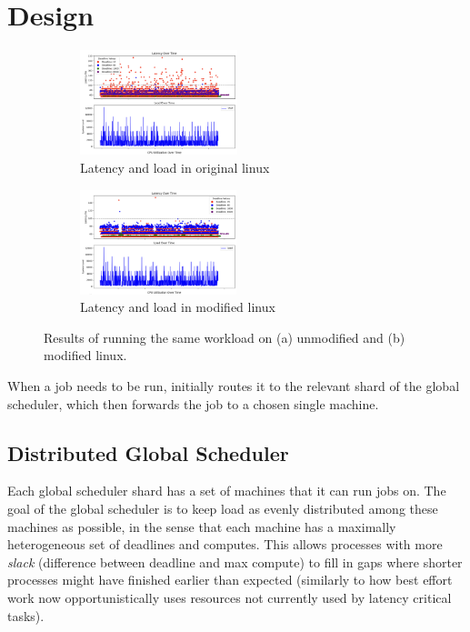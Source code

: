 \section{Design}

\begin{figure}[ht!]
    \centering
    \begin{subfigure}[t]{0.5\textwidth}
        \centering
        \includegraphics[height=1.2in]{img/old_lnx__2ms_wait__10K_iter.png}
        \caption{Latency and load in original linux}
    \end{subfigure}%
    \hfill
    \begin{subfigure}[t]{0.5\textwidth}
        \centering
        \includegraphics[height=1.2in]{img/new_lnx__2ms_wait__10K_iter.png}
        \caption{Latency and load in modified linux}
        \label{fig:graph:new}
    \end{subfigure}
    \vspace{10pt}
    \caption{Results of running the same workload on (a) unmodified and (b) modified linux.}
    \label{fig:graph}
\end{figure}

When a job needs to be run, \sysname{} initially routes it to the relevant shard
of the global scheduler, which then forwards the job to a chosen single machine.


\subsection*{Distributed Global Scheduler}

Each global scheduler shard has a set of machines that it can run jobs on. The
goal of the global scheduler is to keep load as evenly distributed among these
machines as possible, in the sense that each machine has a maximally
heterogeneous set of deadlines and computes. This allows processes with more
\textit{slack} (difference between deadline and max compute) to fill in gaps
where shorter processes might have finished earlier than expected (similarly to
how best effort work now opportunistically uses resources not currently used by
latency critical tasks).

